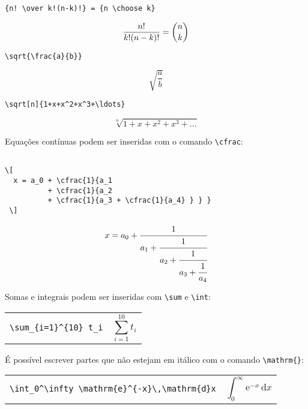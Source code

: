 \begin{verbatim}
{n! \over k!(n-k)!} = {n \choose k}
\end{verbatim}

\begin{displaymath}
{n! \over k!(n-k)!} = {n \choose k}
\end{displaymath}

\begin{verbatim}
\sqrt{\frac{a}{b}}
\end{verbatim}

\begin{displaymath}
\sqrt{\frac{a}{b}}
\end{displaymath}

\begin{verbatim}
\sqrt[n]{1+x+x^2+x^3+\ldots}
\end{verbatim}

\[ \sqrt[n]{1+x+x^2+x^3+\ldots} \]

Equações contínuas podem ser inseridas com o comando \verb+\cfrac+:

\begin{verbatim}

\[ 
  x = a_0 + \cfrac{1}{a_1
          + \cfrac{1}{a_2
          + \cfrac{1}{a_3 + \cfrac{1}{a_4} } } }
 \]

\end{verbatim}

\[ 
  x = a_0 + \cfrac{1}{a_1
          + \cfrac{1}{a_2
          + \cfrac{1}{a_3 + \cfrac{1}{a_4} } } }
 \]

\bigskip


Somas e integrais podem ser inseridas com \verb+\sum+ e \verb+\int+:

\begin{tabular}{cc}
\begin{minipage}{0.4\textwidth}
\verb+\sum_{i=1}^{10} t_i+
\end{minipage} & \begin{minipage}{0.4\textwidth}\[ \sum_{i=1}^{10} t_i \] \end{minipage}
\end{tabular}

\bigskip

É possível escrever partes que não estejam em itálico com o comando \verb+\mathrm{}+:



\begin{tabular}{cc}
\begin{minipage}{0.4\textwidth}
\verb+\int_0^\infty \mathrm{e}^{-x}\,\mathrm{d}x+
\end{minipage} & \begin{minipage}{0.4\textwidth}\[ \int_0^\infty \mathrm{e}^{-x}\,\mathrm{d}x \] \end{minipage}
\end{tabular}

